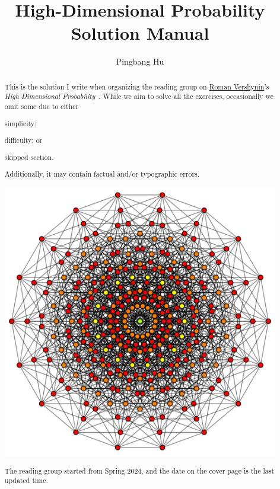 \documentclass[a4paper]{report}
\author{Pingbang Hu}
\title{High-Dimensional Probability\\Solution Manual}
\begin{document}
\maketitle

\begin{abstract}
	This is the solution I write when organizing the reading group on \href{https://www.math.uci.edu/~rvershyn/}{Roman Vershynin}'s \emph{High Dimensional Probability}~\cite{vershyninHighDimensionalProbability2024}. While we aim to solve all the exercises, occasionally we omit some due to either
	\begin{enumerate*}[label=\arabic*.)]
		\item simplicity;
		\item difficulty; or
		\item skipped section.
	\end{enumerate*}
	Additionally, it may contain factual and/or typographic errors.

	\vfill
	\begin{center}
		\includegraphics[width=\linewidth]{Figures/cover.png}
	\end{center}
	\vfill
	The reading group started from Spring 2024, and the date on the cover page is the last updated time.
\end{abstract}

\tableofcontents



% 

\newpage
\printbibliography{}
\end{document}
